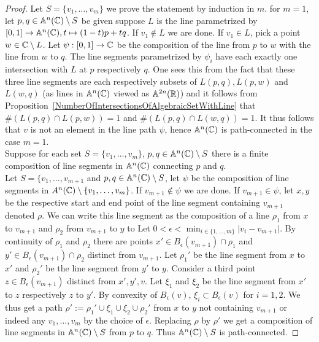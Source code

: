 \begin{proof}
    Let $S=\{v_1,\dots,v_m\}$ we prove the statement by induction in $m$. for $m=1$, let $p,q\in \mathbb{A}^n(\mathbb{C})\setminus S$ be given suppose $L$ is the line parametrized by $[0,1]\rightarrow \mathbb{A}^n(\mathbb{C}), t \mapsto (1-t)p + tq$. If $v_1\notin L$ we are done. If $v_1\in L$, pick a point $w\in \mathbb{C} \setminus L$. Let $\psi : [0,1]\rightarrow \mathbb{C}$ be the composition of the line from $p$ to $w$ with the line from $w$ to $q$. The line segments parametrized by $\psi_i$ have each exactly one intersection with $L$ at $p$ respectively $q$. One sees this from the fact that these three line 
    segments are each respectively subsets of $L(p,q),L(p,w)$ and $L(w,q)$ (as lines in $\mathbb{A}^n(\mathbb{C})$ viewed as $\mathbb{A}^{2n}(\mathbb{R})$) and it follows from Proposition~\ref{NumberOfIntersectionsOfAlgebraicSetWithLine} that $\#\left(L(p,q)\cap L(p,w)\right)= 1$ and $\#\left(L(p,q)\cap L(w,q)\right)= 1$. It thus follows that $v$ is not an element in the line path $\psi$, hence $\mathbb{A}^n(\mathbb{C})$ is path-connected in the case $m=1$.\\
    Suppose for each set $S=\{v_1,\dots,v_m\}$, $p,q\in \mathbb{A}^n(\mathbb{C})\setminus S$ there is a finite composition of line segments in $\mathbb{A}^n(\mathbb{C})$ connecting $p$ and $q$.\\
    Let $S=\{v_1,\dots,v_{m+1}$ and $p,q\in \mathbb{A}^n(\mathbb{C})\setminus S$, let $\psi$ be the composition of line segments in $A^n(\mathbb{C})\setminus \{v_1,\dots,v_m\}$. If $v_{m+1}\notin \psi$ we are done. If $v_{m+1}\in \psi$, let $x, y$ be the respective start and end point of the line segment containing $v_{m+1}$ denoted $\rho$. We can write this line segment as the composition of a line $\rho_1$ from $x$ to $v_{m+1}$ and $\rho_2$ from $v_{m+1}$ to $y$ to Let $0<\epsilon < \min_{i\in\{1,\dots,m\}} \vert v_i-v_{m+1}\vert$. By continuity of $\rho_1$ and $\rho_2$ there are points $x'\in B_\epsilon(v_{m+1})\cap \rho_1$ and $y'\in B_\epsilon(v_{m+1})\cap \rho_2$ distinct from $v_{m+1}$. Let $\rho_1'$ be the line segment from $x$ to $x'$ and $\rho_2'$ be the line segment from $y'$ to $y$. Consider a third point $z\in B_\epsilon(v_{m+1})$ distinct from $x',y',v$. Let $\xi_1$ and $\xi_2$ be the line segment from $x'$ to $z$ respectively $z$ to $y'$. By convexity of $B_\epsilon(v)$, $\xi_i\subset B_\epsilon(v)$ for $i=1,2$. We thus get a path $\rho':= \rho_1'\cup \xi_1\cup\xi_2\cup \rho_2'$ from $x$ to $y$ not containing $v_{m+1}$ or indeed any $v_1,\dots,v_m$ by the choice of $\epsilon$. Replacing $\rho$ by $\rho'$ we get a composition of line segments in $\mathbb{A}^n(\mathbb{C})\setminus S$ from $p$ to $q$.  Thus $\mathbb{A}^n(\mathbb{C})\setminus S$ is path-connected.     
\end{proof}

